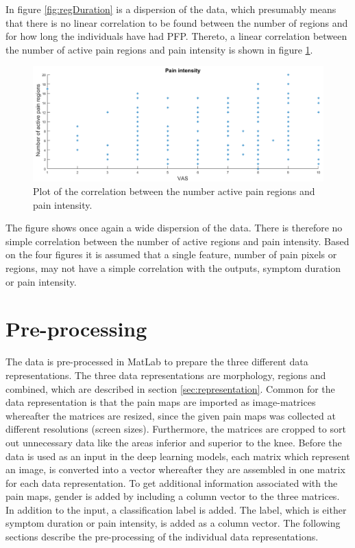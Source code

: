 \newpage
\noindent
In figure \ref{fig:regDuration} is a dispersion of the data, which presumably means that there is no linear correlation to be found between the number of regions and for how long the individuals have had PFP. 
Thereto, a linear correlation between the number of active pain regions and pain intensity is shown in figure \ref{fig:regPain}.

\begin{figure} [H]
\centering
\includegraphics[width=1\textwidth]{figures/regionRegressionPain}
\caption{Plot of the correlation between the number active pain regions and pain intensity.}
\label{fig:regPain}
\end{figure}

\noindent
The figure shows once again a wide dispersion of the data. There is therefore no simple correlation between the number of active regions and pain intensity. 
\noindent
Based on the four figures it is assumed that a single feature, number of pain pixels or regions, may not have a simple correlation with the outputs, symptom duration or pain intensity. 


\section{Pre-processing} \label{sec:prepros}
The data is pre-processed in MatLab to prepare the three different data representations. The three data representations are morphology, regions and combined, which are described in section \ref{sec:representation}. Common for the data representation is that the pain maps are imported as image-matrices whereafter the matrices are resized, since the given pain maps was collected at different resolutions (screen sizes). Furthermore, the matrices are cropped to sort out unnecessary data like the areas inferior and superior to the knee.
Before the data is used as an input in the deep learning models, each matrix which represent an image, is converted into a vector whereafter they are assembled in one matrix for each data representation. To get additional information associated with the pain maps, gender is added by including a column vector to the three matrices.
In addition to the input, a classification label is added. The label, which is either symptom duration or pain intensity, is added as a column vector.
The following sections describe the pre-processing of the individual data representations.


